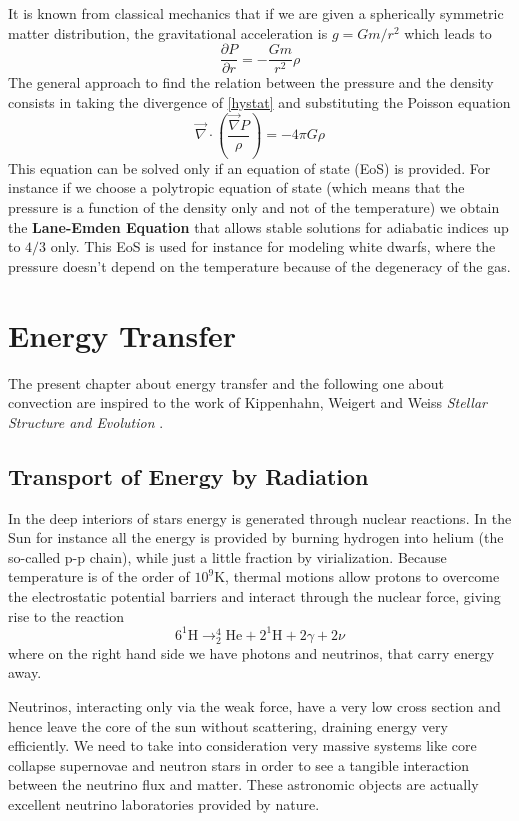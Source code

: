 It is known from classical mechanics that if we are given a spherically symmetric matter distribution, the gravitational acceleration is $g=Gm/r^2$ which leads to
\begin{equation}\label{HydroEquilibrium}
	\frac{\partial P}{\partial r}= - \frac{G m}{r^2} \rho
\end{equation}
The general approach to find the relation between the pressure and the density consists in taking the divergence of \ref{hystat} and substituting the Poisson equation 
$$
\vec \nabla \cdot \left ( \frac{\vec \nabla P}{\rho} \right ) = - 4 \pi G \rho 
$$
This equation can be solved only if an equation of state (EoS) is provided. For instance if we choose a polytropic equation of state (which means that the pressure is a function of the density only and not of the temperature) we obtain the \textbf{Lane-Emden Equation} that allows stable solutions for adiabatic indices up to $4/3$ only. This EoS is used for instance for modeling white dwarfs, where the pressure doesn't depend on the temperature because of the degeneracy of the gas. 

\section{Energy Transfer}
	The present chapter about energy transfer and the following one about convection are inspired to the work of Kippenhahn, Weigert and Weiss \textit{Stellar Structure and Evolution} \citet{stellarstruc}.
\subsection{Transport of Energy by Radiation}
In the deep interiors of stars energy is generated through nuclear reactions. In the Sun for instance all the energy is provided by burning hydrogen into helium (the so-called p-p chain), while just a little fraction by virialization. Because temperature is of the order of $10^9 \mathrm{K}$, thermal motions allow protons to overcome the electrostatic potential barriers and interact through the nuclear force, giving rise to the reaction
\begin{equation}\label{ppchain}
	6 ^1\mathrm{H} \to ^4_2\mathrm{He} + 2 ^1\mathrm{H} + 2 \gamma + 2 \nu
\end{equation}
where on the right hand side we have photons and neutrinos, that carry energy away. 

Neutrinos, interacting only via the weak force, have a very low cross section and hence leave the core of the sun without scattering, draining energy very efficiently. We need to take into consideration very massive systems like core collapse supernovae and neutron stars in order to see a tangible interaction between the neutrino flux and matter. These astronomic objects are actually excellent neutrino laboratories provided by nature. 

